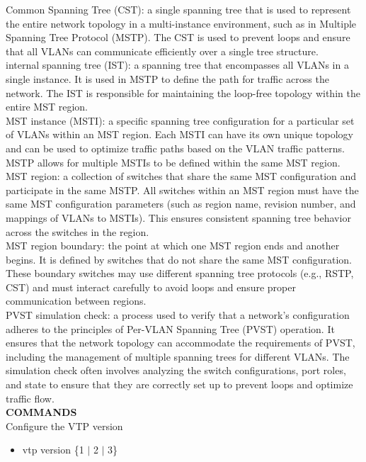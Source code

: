 \documentclass{article}
\begin{document}
Common Spanning Tree (CST): a single spanning tree that is used to represent the entire network topology in a multi-instance environment, such as in Multiple Spanning Tree Protocol (MSTP). The CST is used to prevent loops and ensure that all VLANs can communicate efficiently over a single tree structure.\\

internal spanning tree (IST): a spanning tree that encompasses all VLANs in a single instance. It is used in MSTP to define the path for traffic across the network. The IST is responsible for maintaining the loop-free topology within the entire MST region.\\

MST instance (MSTI): a specific spanning tree configuration for a particular set of VLANs within an MST region. Each MSTI can have its own unique topology and can be used to optimize traffic paths based on the VLAN traffic patterns. MSTP allows for multiple MSTIs to be defined within the same MST region.\\

MST region: a collection of switches that share the same MST configuration and participate in the same MSTP. All switches within an MST region must have the same MST configuration parameters (such as region name, revision number, and mappings of VLANs to MSTIs). This ensures consistent spanning tree behavior across the switches in the region.\\

MST region boundary: the point at which one MST region ends and another begins. It is defined by switches that do not share the same MST configuration. These boundary switches may use different spanning tree protocols (e.g., RSTP, CST) and must interact carefully to avoid loops and ensure proper communication between regions.\\

PVST simulation check: a process used to verify that a network's configuration adheres to the principles of Per-VLAN Spanning Tree (PVST) operation. It ensures that the network topology can accommodate the requirements of PVST, including the management of multiple spanning trees for different VLANs. The simulation check often involves analyzing the switch configurations, port roles, and state to ensure that they are correctly set up to prevent loops and optimize traffic flow.\\

\noindent\textbf{COMMANDS}\\
Configure the VTP version
\begin{itemize}
\item vtp version \{1 $|$ 2 $|$ 3\}
\end{itemize}
\end{document}
